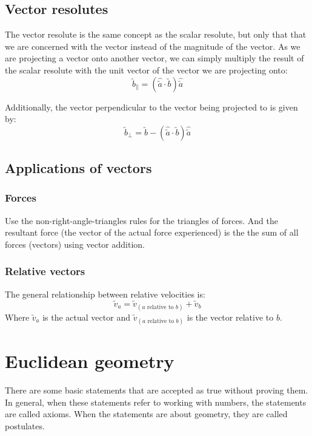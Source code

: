 \documentclass{book}
\begin{document}
\section{Vector resolutes}
The vector resolute is the same concept as the scalar resolute, but only that that we are concerned with the vector instead of the magnitude of the vector.  As we are projecting a vector onto another vector, we can simply multiply the result of the scalar resolute with the unit vector of the vector we are projecting onto:
\[
	\utilde{b}_{\parallel} = (\hat{\utilde{a}} \cdot \utilde{b}) \hat{\utilde{a}}
\]

Additionally, the vector perpendicular to the vector being projected to is given by:
\[
	\utilde{b}_{\perp} = \utilde{b} - (\hat{\utilde{a}} \cdot \utilde{b}) \hat{\utilde{a}}
\]

\section{Applications of vectors}
\subsection{Forces}
Use the non-right-angle-triangles rules for the triangles of forces.  And the resultant force (the vector of the actual force experienced) is the the sum of all forces (vectors) using vector addition.

\subsection{Relative vectors}
The general relationship between relative velocities is:
\[
	\utilde{v}_a = \utilde{v}_{(\text{$a$ relative to $b$})} + \utilde{v}_b
\]
Where $\utilde{v}_a$ is the actual vector and $\utilde{v}_{(\text{$a$ relative to $b$})}$ is the vector relative to $b$.

\chapter{Euclidean geometry}
There are some basic statements that are accepted as true without proving them.  In general, when these statements refer to working with numbers, the statements are called axioms.  When the statements are about geometry, they are called postulates.
\end{document}
